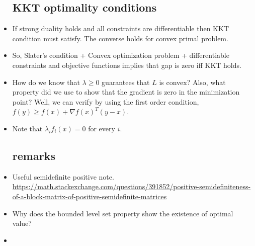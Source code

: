 \documentclass{article}
\theoremstyle{remark}
\begin{document}
\begin{itemize}
    \subsection*{KKT optimality conditions}
    \item If strong duality holds and all constraints are differentiable then KKT condition must satisfy. The converse holds for convex primal problem. 
    \item So, Slater's condition + Convex optimization problem + differentiable constraints and objective functions implies that gap is zero iff KKT holds.
    \item How do we know that $\lambda\geq 0$ guarantees that $L$ is convex? Also, what property did we use to show that the gradient is zero in the minimization point? Well, we can verify by using the first order condition, $f(y)\geq f(x)+\nabla f(x)^T (y-x)$.
    \item Note that $\lambda_i f_i(x)=0$ for every $i$.



    
    \subsection*{remarks}
    \item Useful semidefinite positive note. \url{https://math.stackexchange.com/questions/391852/positive-semidefiniteness-of-a-block-matrix-of-positive-semidefinite-matrices}
    \item Why does the bounded level set property show the existence of optimal value?
    \item 
    \end{itemize}

\newpage
\end{document}
